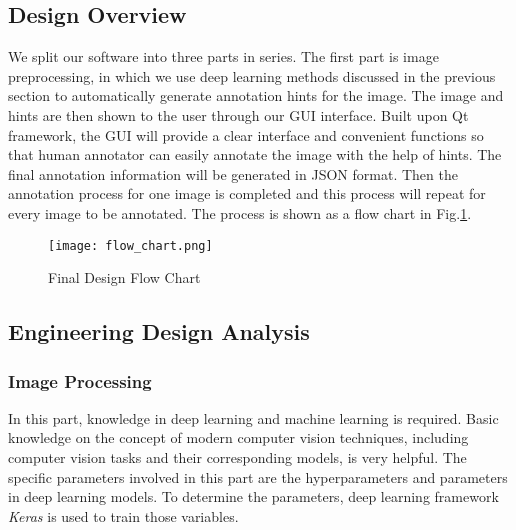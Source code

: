\subsection{Design Overview}
We split our software into three parts in series. The first part is image
preprocessing, in which we use deep learning methods discussed in the previous
section to automatically generate annotation hints for the image. The image and
hints are then shown to the user through our GUI interface. Built upon Qt
framework, the GUI will provide a clear interface and convenient functions so
that human annotator can easily annotate the image with the help of hints. The
final annotation information will be generated in JSON format. Then the
annotation process for one image is completed and this process will repeat for
every image to be annotated. The process is shown as a flow chart in
Fig.\ref{fig:FlowChart}.


\begin{figure}[h!]
  \centering \texttt{[image: flow\_chart.png]}
  \caption{Final Design Flow Chart}
  \label{fig:FlowChart}
\end{figure}


\subsection{Engineering Design Analysis}
\subsubsection{Image Processing}
In this part, knowledge in deep learning and machine learning is required.
Basic knowledge on the concept of modern computer vision techniques, including
computer vision tasks and their corresponding models, is very helpful. The
specific parameters involved in this part are the hyperparameters and
parameters in deep learning models. To determine the parameters, deep learning
framework \textit{Keras} is used to train those variables.

